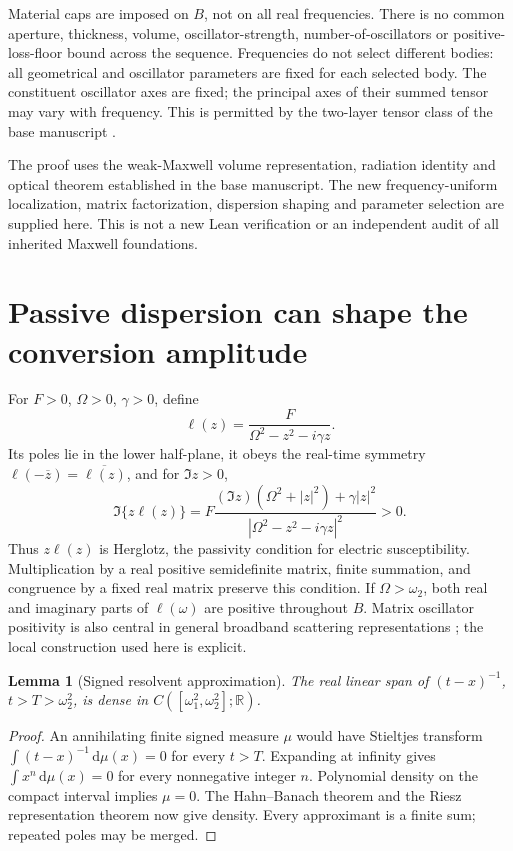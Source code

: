 \documentclass[11pt]{article}
\newtheorem{lemma}{Lemma}
\newcommand{\abs}[1]{\left|#1\right|}
\newcommand{\dd}{\,\mathrm d}
\begin{document}
Material caps are imposed on $B$, not on all real frequencies. There is no
common aperture, thickness, volume, oscillator-strength, number-of-oscillators
or positive-loss-floor bound across the sequence. Frequencies do not select
different bodies: all geometrical and oscillator parameters are fixed for each
selected body. The constituent oscillator axes are fixed; the principal axes
of their summed tensor may vary with frequency. This is permitted by the
two-layer tensor class of the base manuscript \cite{base}.

The proof uses the weak-Maxwell volume representation, radiation identity and
optical theorem established in the base manuscript. The new frequency-uniform
localization, matrix factorization, dispersion shaping and parameter selection
are supplied here. This is not a new Lean verification or an independent audit
of all inherited Maxwell foundations.

\section{Passive dispersion can shape the conversion amplitude}
For $F>0$, $\Omega>0$, $\gamma>0$, define
\[
 \ell(z)=\frac{F}{\Omega^2-z^2-i\gamma z}.
\]
Its poles lie in the lower half-plane, it obeys the real-time symmetry
$\ell(-\overline z)=\overline{\ell(z)}$, and for $\Im z>0$,
\begin{equation}\label{eq:herglotz}
 \Im\{z\ell(z)\}
 =
 F\frac{(\Im z)(\Omega^2+\abs z^2)+\gamma\abs z^2}
        {\abs{\Omega^2-z^2-i\gamma z}^2}>0.
\end{equation}
Thus $z\ell(z)$ is Herglotz, the passivity condition for electric susceptibility.
Multiplication by a real positive semidefinite matrix, finite summation, and
congruence by a fixed real matrix preserve this condition. If
$\Omega>\omega_2$, both real and imaginary parts of $\ell(\omega)$ are positive
throughout $B$. Matrix oscillator positivity is also central in general
broadband scattering representations \cite{oscillators}; the local construction
used here is explicit.

\begin{lemma}[Signed resolvent approximation]\label{lem:density}
The real linear span of $(t-x)^{-1}$, $t>T>\omega_2^2$, is dense in
$C([\omega_1^2,\omega_2^2];\mathbb R)$.
\end{lemma}
\begin{proof}
An annihilating finite signed measure $\mu$ would have Stieltjes transform
$\int(t-x)^{-1}\dd\mu(x)=0$ for every $t>T$. Expanding at infinity gives
$\int x^n\dd\mu(x)=0$ for every nonnegative integer $n$. Polynomial density on
the compact interval implies $\mu=0$. The Hahn--Banach theorem and the Riesz
representation theorem now give density. Every approximant is a finite sum;
repeated poles may be merged.
\end{proof}
\end{document}
